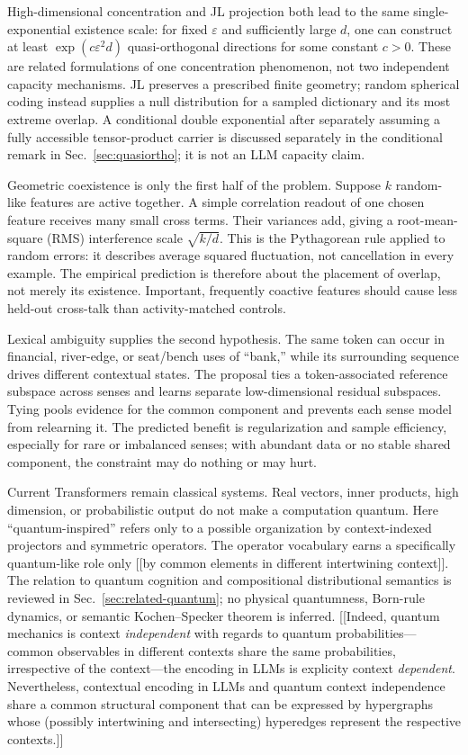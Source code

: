 \documentclass[
  aps,
  reprint,
  superscriptaddress,
  floatfix,
  nofootinbib,
  longbibliography
]{revtex4-2}
\begin{document}
High-dimensional concentration and JL projection both lead to the same
single-exponential existence scale: for fixed $\varepsilon$ and sufficiently
large $d$, one can construct at least
$\exp(c\varepsilon^2d)$ quasi-orthogonal directions for some constant $c>0$.
These are related formulations of one concentration phenomenon, not two
independent capacity mechanisms.  JL preserves a prescribed finite geometry;
random spherical coding instead supplies a null distribution for a sampled
dictionary and its most extreme overlap.  A conditional double exponential
after separately assuming a fully accessible tensor-product carrier is
discussed separately in the conditional remark in
Sec.~\ref{sec:quasiortho}; it is not an LLM capacity
claim.

Geometric coexistence is only the first half of the problem.  Suppose $k$
random-like features are active together.  A simple correlation readout of one
chosen feature receives many small cross terms.  Their variances add, giving a
root-mean-square (RMS) interference scale $\sqrt{k/d}$.  This is the
Pythagorean rule applied to random errors: it describes average squared
fluctuation, not cancellation in every example.  The empirical prediction is
therefore about the placement of overlap, not merely its existence.  Important,
frequently coactive features should cause less held-out cross-talk than
activity-matched controls.

Lexical ambiguity supplies the second hypothesis.  The same token can occur in
financial, river-edge, or seat/bench uses of ``bank,'' while its surrounding
sequence drives different contextual states.  The proposal ties a
token-associated reference subspace across senses and learns separate
low-dimensional residual subspaces.  Tying pools evidence for the common
component and prevents each sense model from relearning it.  The predicted
benefit is regularization and sample efficiency, especially for rare or
imbalanced senses; with abundant data or no stable shared component, the
constraint may do nothing or may hurt.

Current Transformers remain classical systems.  Real vectors, inner products,
high dimension, or probabilistic output do not make a computation quantum.
Here ``quantum-inspired'' refers only to a possible organization by
context-indexed projectors and symmetric operators.  The operator vocabulary
earns a specifically quantum-like role only [[by common elements in different intertwining \cite{gleason} context]].  The
relation to quantum cognition and compositional distributional semantics is
reviewed in Sec.~\ref{sec:related-quantum}; no physical quantumness, Born-rule
dynamics, or semantic Kochen--Specker theorem is inferred.
[[Indeed, quantum mechanics is context \textit{independent} with regards to quantum probabilities---common observables in
different contexts share the same probabilities, irrespective of the context---the encoding in LLMs is explicity
context \textit{dependent}.
Nevertheless, contextual encoding in LLMs and quantum context independence share a common structural component
that can be expressed by hypergraphs whose (possibly intertwining and intersecting) hyperedges represent the respective contexts.]]
\end{document}
